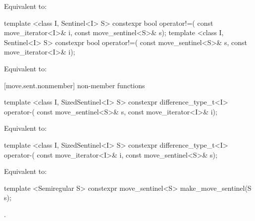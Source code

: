 \begin{itemdescr}
\pnum
\effects Equivalent to: 
\end{itemdescr}

%
%
\begin{itemdecl}
template <class I, Sentinel<I> S>
  constexpr bool operator!=(
    const move_iterator<I>& i, const move_sentinel<S>& s);
template <class I, Sentinel<I> S>
  constexpr bool operator!=(
    const move_sentinel<S>& s, const move_iterator<I>& i);
\end{itemdecl}

\begin{itemdescr}
\pnum
\effects Equivalent to: 
\end{itemdescr}

[move.sent.nonmember]{ non-member functions}

%
%
\begin{itemdecl}
template <class I, SizedSentinel<I> S>
  constexpr difference_type_t<I> operator-(
    const move_sentinel<S>& s, const move_iterator<I>& i);
\end{itemdecl}

\begin{itemdescr}
\pnum
\effects Equivalent to: 
\end{itemdescr}

\begin{itemdecl}
template <class I, SizedSentinel<I> S>
  constexpr difference_type_t<I> operator-(
    const move_iterator<I>& i, const move_sentinel<S>& s);
\end{itemdecl}

\begin{itemdescr}
\pnum
\effects Equivalent to: 
\end{itemdescr}

%
\begin{itemdecl}
template <Semiregular S>
  constexpr move_sentinel<S> make_move_sentinel(S s);
\end{itemdecl}

\begin{itemdescr}
\pnum
\returns {}.
\end{itemdescr}

